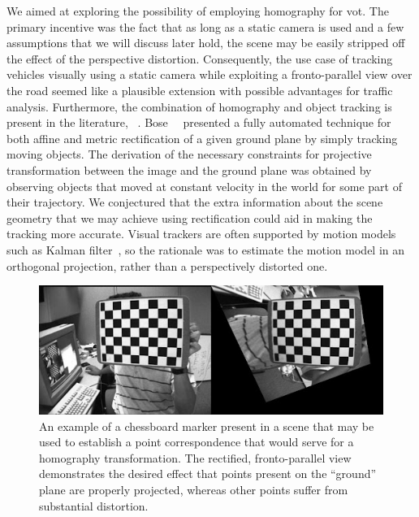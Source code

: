 We aimed at exploring the possibility of employing homography for \gls{vot}. The primary incentive was the fact that as long as a static camera is used and a few assumptions that we will discuss later hold, the scene may be easily stripped off the effect of the perspective distortion. Consequently, the use case of tracking vehicles visually using a static camera while exploiting a fronto-parallel view over the road seemed like a plausible extension with possible advantages for traffic analysis. Furthermore, the combination of homography and object tracking is present in the literature, \egtext{}~\cite{bose2004groundplane, zhang2012homographytrack, Mei2009}. Bose~\etal{}~\cite{bose2004groundplane} presented a fully automated technique for both affine and metric rectification of a given ground plane by simply tracking moving objects. The derivation of the necessary constraints for projective transformation between the image and the ground plane was obtained by observing objects that moved at constant velocity in the world for some part of their trajectory. We conjectured that the extra information about the scene geometry that we may achieve using rectification could aid in making the tracking more accurate. Visual trackers are often supported by motion models such as Kalman filter~\cite{kalman1960linearfilter}, so the rationale was to estimate the motion model in an orthogonal projection, rather than a perspectively distorted one.

\begin{figure}[t]
    \centerline{\includegraphics[width=0.8\linewidth]{figures/homography/chessboard_marker.jpg}}
    \caption[Chessboard marker]{An example of a chessboard marker present in a scene that may be used to establish a point correspondence that would serve for a homography transformation. The rectified, fronto-parallel view demonstrates the desired effect that points present on the ``ground'' plane are properly projected, whereas other points suffer from substantial distortion. }
    \label{fig:ChessboardMarker}
\end{figure}

